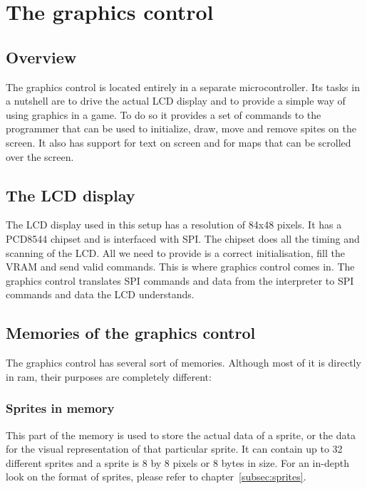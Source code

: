 \chapter{The graphics control}
\label{cha:GraphicsControl}

\section{Overview}
	\par The graphics control is located entirely in a separate microcontroller. Its tasks in a nutshell are to drive the actual LCD display and to provide a simple way of using graphics in a game. To do so it provides a set of commands to the programmer that can be used to initialize, draw, move and remove spites on the screen. It also has support for text on screen and for maps that can be scrolled over the screen.

\section{The LCD display}
	\par The LCD display used in this setup has a resolution of 84x48 pixels. It has a PCD8544 chipset and is interfaced with SPI. The chipset does all the timing and scanning of the LCD. All we need to provide is a correct initialisation, fill the VRAM and send valid commands. This is where graphics control comes in. The graphics control translates SPI commands and data from the interpreter to SPI commands and data the LCD understands.

\section{Memories of the graphics control}
	\par The graphics control has several sort of memories. Although most of it is directly in ram, their purposes are completely different:

	\subsection{Sprites in memory}
		\par This part of the memory is used to store the actual data of a sprite, or the data for the visual representation of that particular sprite. It can contain up to 32 different sprites and a sprite is 8 by 8 pixels or 8 bytes in size. For an in-depth look on the format of sprites, please refer to chapter~\ref{subsec:sprites}.

